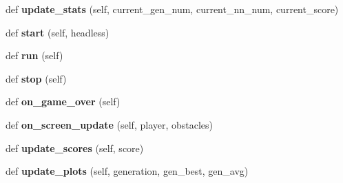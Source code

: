 \begin{DoxyCompactItemize}
\item 
def {\bfseries update\+\_\+stats} (self, current\+\_\+gen\+\_\+num, current\+\_\+nn\+\_\+num, current\+\_\+score)\hypertarget{classMachineGamingWindow_1_1MachineGaming_a04ab71cba412f5717ebaff5c9ca12346}{}\label{classMachineGamingWindow_1_1MachineGaming_a04ab71cba412f5717ebaff5c9ca12346}

\item 
def {\bfseries start} (self, headless)\hypertarget{classMachineGamingWindow_1_1MachineGaming_a3a9714707ad07433db600a5145064fd0}{}\label{classMachineGamingWindow_1_1MachineGaming_a3a9714707ad07433db600a5145064fd0}

\item 
def {\bfseries run} (self)\hypertarget{classMachineGamingWindow_1_1MachineGaming_ac0eca50403df7de38c5d8161fbf04149}{}\label{classMachineGamingWindow_1_1MachineGaming_ac0eca50403df7de38c5d8161fbf04149}

\item 
def {\bfseries stop} (self)\hypertarget{classMachineGamingWindow_1_1MachineGaming_afd9e154143823d295e878d44361fd497}{}\label{classMachineGamingWindow_1_1MachineGaming_afd9e154143823d295e878d44361fd497}

\item 
def {\bfseries on\+\_\+game\+\_\+over} (self)\hypertarget{classMachineGamingWindow_1_1MachineGaming_a9ad321b2297209ff8076f09ae36562be}{}\label{classMachineGamingWindow_1_1MachineGaming_a9ad321b2297209ff8076f09ae36562be}

\item 
def {\bfseries on\+\_\+screen\+\_\+update} (self, player, obstacles)\hypertarget{classMachineGamingWindow_1_1MachineGaming_a6c1acafb87b7e21c1ec900c0b38d3a00}{}\label{classMachineGamingWindow_1_1MachineGaming_a6c1acafb87b7e21c1ec900c0b38d3a00}

\item 
def {\bfseries update\+\_\+scores} (self, score)\hypertarget{classMachineGamingWindow_1_1MachineGaming_ac95f57eab962f80004940192d8b28f72}{}\label{classMachineGamingWindow_1_1MachineGaming_ac95f57eab962f80004940192d8b28f72}

\item 
def {\bfseries update\+\_\+plots} (self, generation, gen\+\_\+best, gen\+\_\+avg)\hypertarget{classMachineGamingWindow_1_1MachineGaming_ae511bee73c8661920e513fac8204e5de}{}\label{classMachineGamingWindow_1_1MachineGaming_ae511bee73c8661920e513fac8204e5de}

\end{DoxyCompactItemize}
